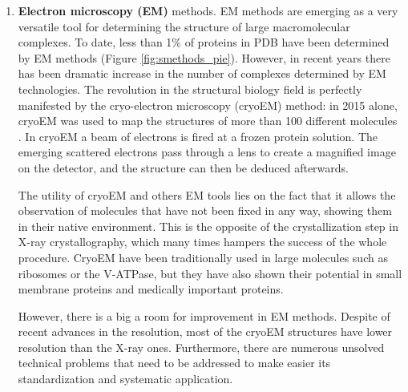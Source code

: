 \documentclass[12pt, b5paper,twoside]{tesi_upf}
\begin{document}
\begin{enumerate}[label=(\alph*)]
\item \textbf{Electron microscopy (EM)} methods. EM methods are emerging as a very versatile tool for determining the structure of large macromolecular complexes. To date, less than 1$\%$ of proteins in PDB have been determined by EM methods (Figure \ref{fig:smethods_pie}). However, in recent years there has been dramatic increase in the number of complexes determined by EM technologies. The revolution in the structural biology field is perfectly manifested by the cryo-electron microscopy (cryoEM) method: in 2015 alone, cryoEM was used to map the structures of more than 100 different molecules \cite{CryoEM}. In cryoEM a beam of electrons is fired at a frozen protein solution. The
emerging scattered electrons pass through a lens to create a magnified image on the detector, and the structure can then be deduced afterwards. 
\par The utility of cryoEM and others EM tools lies on the fact that it allows the observation of molecules that have not been fixed in any way, showing them in their native environment. This is the opposite of the crystallization step in X-ray crystallography, which many times hampers the success of the whole procedure. CryoEM have been traditionally used in large molecules such as ribosomes\cite{Khatter2015} or the V-ATPase\cite{Zhao2015}, but they have also shown their potential in small membrane proteins\cite{Liao2013} and medically important proteins\cite{Bai2015}. 
\par However, there is a big a room for improvement in EM methods. Despite of recent advances in the resolution, most of the cryoEM structures have lower resolution than the X-ray ones. Furthermore, there are numerous unsolved technical  problems that need to be addressed to make easier its standardization and systematic application.
\end{enumerate}
 
\end{document}
